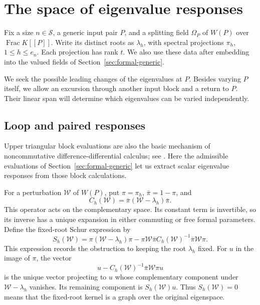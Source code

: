 \documentclass[11pt]{article}
\theoremstyle{definition}
\theoremstyle{remark}
\numberwithin{equation}{section}
\begin{document}
\section{The space of eigenvalue responses}\label{sec:responses}

Fix a size $n\in\mathcal S$, a generic input pair $P$, and a splitting
field $\Omega_P$ of $W(P)$ over $\operatorname{Frac}K[[P]]$.
Write its distinct roots as $\lambda_h$, with spectral projections
$\pi_h$, $1\le h\le e_n$.  Each projection has rank $t$.
We also use these data after embedding into the valued fields of
Section~\ref{sec:formal-generic}.

We seek the possible leading changes of the eigenvalues at $P$.
Besides varying $P$ itself, we allow an excursion through another
input block and a return to $P$.  Their linear span will determine
which eigenvalues can be varied independently.

\subsection{Loop and paired responses}\label{subsec:response-formulas}

Upper triangular block evaluations are also the basic mechanism of
noncommutative difference-differential calculus; see
\cite[Proposition~2.2 and Theorem~3.11]{KaliuzhnyiVerbovetskyiVinnikov2014}.
Here the admissible evaluations of Section~\ref{sec:formal-generic}
let us extract scalar eigenvalue responses from those block calculations.

For a perturbation $\mathcal W$ of $W(P)$, put $\pi=\pi_h$,
$\bar\pi=1-\pi$, and
\[
 C_h(\mathcal W)=\bar\pi(\mathcal W-\lambda_h)\bar\pi.
\]
This operator acts on the complementary space. Its constant term is
invertible, so its inverse has a unique expansion in either commuting
or free formal parameters. Define the fixed-root Schur expression by
\begin{equation}
S_h(\mathcal W)=
 \pi(\mathcal W-\lambda_h)\pi
 -\pi\mathcal W\bar\pi
  C_h(\mathcal W)^{-1}
  \bar\pi\mathcal W\pi.
 \label{eq:fixed-schur}
\end{equation}
This expression records the obstruction to keeping the root $\lambda_h$
fixed. For $u$ in the image of $\pi$, the vector
\[
 u-C_h(\mathcal W)^{-1}\bar\pi\mathcal W\pi u
\]
is the unique vector projecting to $u$ whose complementary component
under $\mathcal W-\lambda_h$ vanishes. Its remaining component is
$S_h(\mathcal W)u$. Thus $S_h(\mathcal W)=0$ means that the fixed-root
kernel is a graph over the original eigenspace.
\end{document}
